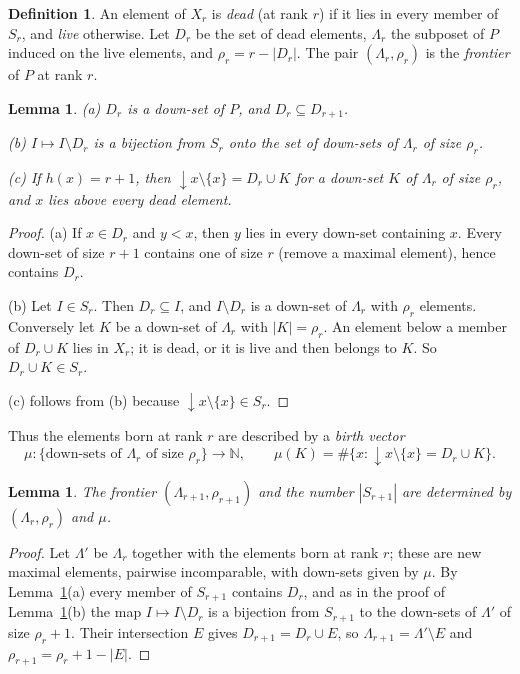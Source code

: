 \documentclass[11pt]{amsart}
\newtheorem{lemma}[theorem]{Lemma}
\theoremstyle{definition}
\newtheorem{definition}[theorem]{Definition}
\theoremstyle{remark}
\newcommand{\dn}{{\downarrow}}
\newcommand{\N}{\mathbb{N}}
\begin{document}
\begin{definition}
An element of $X_r$ is \emph{dead} (at rank $r$) if it lies in every member of
$S_r$, and \emph{live} otherwise.  Let $D_r$ be the set of dead elements,
$\Lambda_r$ the subposet of $P$ induced on the live elements, and
$\rho_r = r - |D_r|$.  The pair $(\Lambda_r,\rho_r)$ is the \emph{frontier} of $P$ at
rank $r$.
\end{definition}

\begin{lemma}\label{lem:frontier}
\textup{(a)} $D_r$ is a down-set of $P$, and $D_r \subseteq D_{r+1}$.

\textup{(b)} $I \mapsto I \setminus D_r$ is a bijection from $S_r$ onto the set of
down-sets of $\Lambda_r$ of size $\rho_r$.

\textup{(c)} If $h(x) = r+1$, then $\dn x \setminus\{x\} = D_r \cup K$ for a down-set $K$ of $\Lambda_r$
of size $\rho_r$, and $x$ lies above every dead element.
\end{lemma}

\begin{proof}
(a) If $x \in D_r$ and $y < x$, then $y$ lies in every down-set containing $x$.  Every
down-set of size $r+1$ contains one of size $r$ (remove a maximal element), hence
contains $D_r$.

(b) Let $I \in S_r$.  Then $D_r \subseteq I$, and $I \setminus D_r$ is a down-set of
$\Lambda_r$ with $\rho_r$ elements.  Conversely let $K$ be a down-set of $\Lambda_r$
with $|K| = \rho_r$.  An element below a member of $D_r \cup K$ lies in $X_r$; it is
dead, or it is live and then belongs to $K$.  So $D_r \cup K \in S_r$.

(c) follows from (b) because $\dn x \setminus \{x\} \in S_r$.
\end{proof}

Thus the elements born at rank $r$ are described by a \emph{birth vector}
\[
  \mu \colon \{\text{down-sets of } \Lambda_r \text{ of size } \rho_r\} \to \N,
  \qquad \mu(K) = \#\{x : \dn x \setminus\{x\} = D_r \cup K\}.
\]

\begin{lemma}\label{lem:next}
The frontier $(\Lambda_{r+1},\rho_{r+1})$ and the number $|S_{r+1}|$ are determined by
$(\Lambda_r,\rho_r)$ and $\mu$.
\end{lemma}

\begin{proof}
Let $\Lambda'$ be $\Lambda_r$ together with the elements born at rank $r$; these are
new maximal elements, pairwise incomparable, with down-sets given by $\mu$.  By
Lemma~\ref{lem:frontier}(a) every member of $S_{r+1}$ contains $D_r$, and as in the
proof of Lemma~\ref{lem:frontier}(b) the map $I \mapsto I \setminus D_r$ is a
bijection from $S_{r+1}$ to the down-sets of $\Lambda'$ of size $\rho_r + 1$.  Their
intersection $E$ gives $D_{r+1} = D_r \cup E$, so $\Lambda_{r+1} = \Lambda' \setminus E$
and $\rho_{r+1} = \rho_r + 1 - |E|$.
\end{proof}
\end{document}
